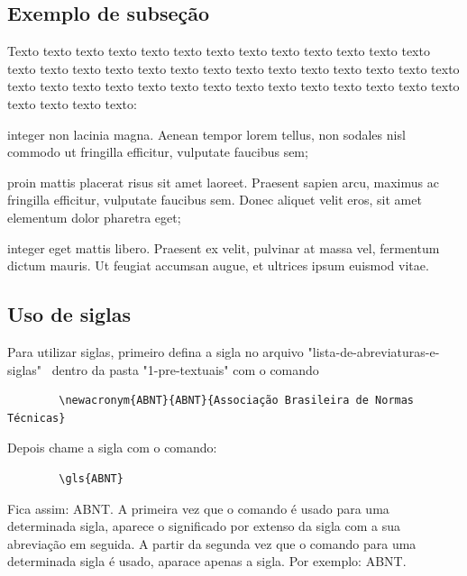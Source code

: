 \subsection{Exemplo de subseção} \label{sec:ex_sec}
	
    Texto texto texto texto texto texto texto texto texto texto texto texto texto texto texto texto texto texto texto texto texto texto texto texto texto texto texto texto texto texto texto texto texto texto texto texto texto texto texto texto texto texto texto texto texto:


\begin{alineas}
  \item integer non lacinia magna. Aenean tempor lorem tellus, non sodales nisl commodo ut fringilla efficitur, vulputate faucibus sem;
  \item proin mattis placerat risus sit amet laoreet. Praesent sapien arcu, maximus ac fringilla efficitur, vulputate faucibus sem. Donec aliquet velit eros, sit amet elementum dolor pharetra eget;
  \item integer eget mattis libero. Praesent ex velit, pulvinar at massa vel, fermentum dictum mauris. Ut feugiat accumsan augue, et ultrices ipsum euismod vitae.
\end{alineas}
  
\subsection{Uso de siglas} \label{sec:siglas}

    Para utilizar siglas, primeiro defina a sigla no arquivo "lista-de-abreviaturas-e-siglas"~ dentro da pasta "1-pre-textuais" com o comando 
    \begin{verbatim}
        \newacronym{ABNT}{ABNT}{Associação Brasileira de Normas Técnicas}
    \end{verbatim}
    Depois chame a sigla com o comando:
    \begin{verbatim}
        \gls{ABNT}
    \end{verbatim}
    Fica assim: \gls{ABNT}. A primeira vez que o comando é usado para uma determinada sigla, aparece o significado por extenso da sigla com a sua abreviação em seguida. A partir da segunda vez que o comando para uma determinada sigla é usado, aparace apenas a sigla. Por exemplo: \gls{ABNT}.  
    
